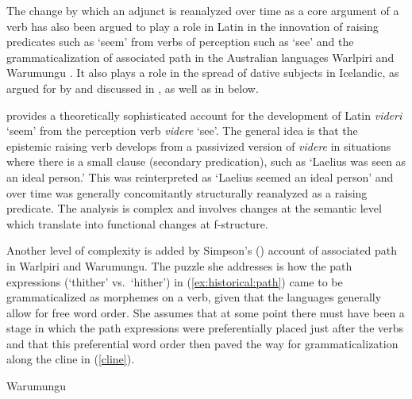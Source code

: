 \documentclass[output=paper,hidelinks]{langscibook}
\begin{document}
    

The change by which an adjunct is reanalyzed over time as a core argument of a verb has also been argued to play a role in Latin in the innovation of raising predicates such as `seem' from verbs of perception such as `see' \citep{barron2001} and the grammaticalization of associated path in the Australian languages Warlpiri and Warumungu \citep{simpson2001}. It also plays a role in the spread of dative subjects in Icelandic, as argued for by \citet{schaetzle18} and discussed in , as well as in  below.

\citet{barron2001} provides a theoretically sophisticated account for the development of Latin \textit{videri} `seem' from the perception verb \textit{videre} `see'.  The general idea is that the epistemic raising verb develops from a passivized version of \textit{videre} in situations where there is a small clause (secondary predication), such as `Laelius was seen as an ideal person.'  This was reinterpreted as `Laelius seemed an ideal person' and  over time was generally concomitantly structurally reanalyzed as a raising predicate.  The analysis is complex and involves changes at the semantic level which translate into functional changes at f-structure. 

Another level of complexity is added by Simpson's
(\citeyear{simpson2001}) account of associated path in Warlpiri and Warumungu. The puzzle she addresses is how the path expressions (`thither' vs.~`hither')  in (\ref{ex:historical:path}) came to be grammaticalized as morphemes on a verb, given that the languages generally allow for free word order.  She assumes that at some point there must have been a stage in which the path expressions were preferentially placed just after the verbs and that this preferential word order then paved the way for grammaticalization along the cline in (\ref{cline}).

\begin{exe} 
\ex \label{ex:historical:path} Warumungu \citep[174]{simpson2001}
\begin{xlist}
\end{xlist}
\end{exe}
\end{document}
